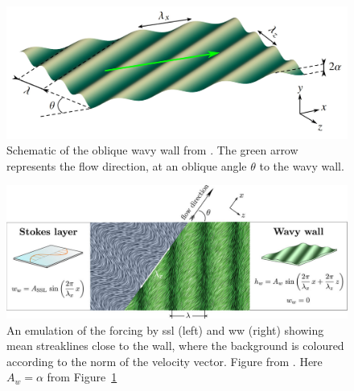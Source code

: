 \begin{figure}[htbp]
	\centering
	\includegraphics[width=0.7\linewidth]{introduction/fig/ww.jpg}
	\caption[Schematic of the oblique wavy wall]{Schematic of the oblique wavy wall from \cite{ghebali2018}. The green arrow represents the flow direction, at an oblique angle $\theta$ to the wavy wall.}
	\label{fig:ww}
\end{figure}
\begin{figure}[htbp]
	\centering
	\includegraphics[width=0.9\linewidth]{introduction/fig/wwssl.jpeg}
	\caption[Comparison of mean streaklines close to the wall between SSL and WW]{An emulation of the forcing by \gls{ssl} (left) and \gls{ww} (right) showing mean streaklines close to the wall, where the background is coloured according to the norm of the velocity vector. Figure from \sgc. Here $A_w=\alpha$ from Figure~\ref{fig:ww}}
	\label{fig:sslwwcomparison}
\end{figure}

